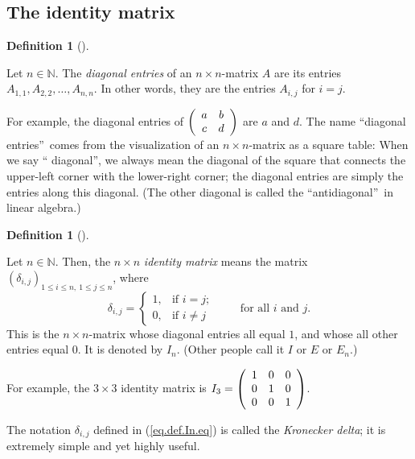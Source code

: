 \documentclass[numbers=enddot,12pt,final,onecolumn,notitlepage]{scrartcl}%
\theoremstyle{definition}
\newtheorem{defi}[theo]{Definition}
\newenvironment{definition}[1][]
{\begin{defi}[#1]\begin{leftbar}}
{\end{leftbar}\end{defi}}
\begin{document}
\subsection{The identity matrix}

\begin{definition}
Let $n\in\mathbb{N}$. The \textit{diagonal entries} of an $n\times n$-matrix
$A$ are its entries $A_{1,1},A_{2,2},\ldots,A_{n,n}$. In other words, they are
the entries $A_{i,j}$ for $i=j$.
\end{definition}

For example, the diagonal entries of $\left(
\begin{array}
[c]{cc}%
a & b\\
c & d
\end{array}
\right)  $ are $a$ and $d$. The name \textquotedblleft diagonal
entries\textquotedblright\ comes from the visualization of an $n\times
n$-matrix as a square table: When we say \textquotedblleft
diagonal\textquotedblright, we always mean the diagonal of the square that
connects the upper-left corner with the lower-right corner; the diagonal
entries are simply the entries along this diagonal. (The other diagonal is
called the \textquotedblleft antidiagonal\textquotedblright\ in linear algebra.)

\begin{definition}
Let $n\in\mathbb{N}$. Then, the $n\times n$ \textit{identity matrix} means the
matrix $\left(  \delta_{i,j}\right)  _{1\leq i\leq n,\ 1\leq j\leq n}$, where%
\begin{equation}
\delta_{i,j}=%
\begin{cases}
1, & \text{if }i=j;\\
0, & \text{if }i\neq j
\end{cases}
\ \ \ \ \ \ \ \ \ \ \text{for all }i\text{ and }j. \label{eq.def.In.eq}%
\end{equation}
This is the $n\times n$-matrix whose diagonal entries all equal $1$, and whose
all other entries equal $0$. It is denoted by $I_{n}$. (Other people call it
$I$ or $E$ or $E_{n}$.)
\end{definition}

For example, the $3\times3$ identity matrix is $I_{3}=\left(
\begin{array}
[c]{ccc}%
1 & 0 & 0\\
0 & 1 & 0\\
0 & 0 & 1
\end{array}
\right)  $.

The notation $\delta_{i,j}$ defined in (\ref{eq.def.In.eq}) is called the
\textit{Kronecker delta}; it is extremely simple and yet highly useful.
\end{document}
